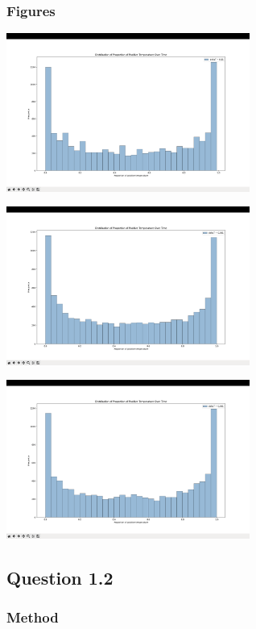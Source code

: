 \documentclass{article}
\begin{document}
\subsubsection*{Figures}

\includegraphics[width=0.6\textwidth]{q1_p1_f1.png}

\includegraphics[width=0.6\textwidth]{q1_p1_f2.png}

\includegraphics[width=0.6\textwidth]{q1_p1_f3.png}


\subsection*{Question 1.2}

\subsubsection*{Method}
\lipsum[1]\\

\lipsum[2]\\
\end{document}
